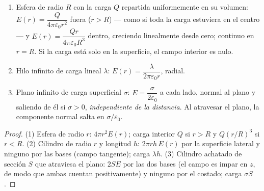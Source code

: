 \begin{proposition}\label{prop:b1:electrostatics-gauss:three}
\begin{enumerate}
  \item Esfera de radio $R$ con la carga $Q$ repartida uniformemente en su
        volumen: $E(r) = \dfrac{Q}{4\pi\varepsilon_0r^2}$ fuera ($r > R$) ---
        como si toda la carga estuviera en el centro --- y $E(r) =
        \dfrac{Qr}{4\pi\varepsilon_0R^3}$ dentro, creciendo linealmente desde cero;
        continuo en $r = R$. Si la carga está solo en la superficie, el
        campo interior es nulo.
  \item Hilo infinito de carga lineal $\lambda$: $E(r) =
        \dfrac{\lambda}{2\pi\varepsilon_0 r}$, radial.
  \item Plano infinito de carga superficial $\sigma$: $E = \dfrac{\sigma}{2\varepsilon_0}$
        a cada lado, normal al plano y saliendo de él si
        $\sigma > 0$, \emph{independiente de la distancia}. Al atravesar el
        plano, la componente normal salta en $\sigma/\varepsilon_0$.
\end{enumerate}
\end{proposition}

\begin{proof}
(1) Esfera de radio $r$:  $4\pi r^2E(r)$; carga interior $Q$ si
$r > R$ y $Q(r/R)^3$ si $r < R$. (2) Cilindro de radio $r$ y longitud $h$:
 $2\pi rh\,E(r)$ por la superficie lateral y ninguno por las bases
(campo tangente); carga $\lambda h$. (3) Cilindro achatado de sección $S$
que atraviesa el plano:  $2SE$ por las dos bases (el campo es impar
en $z$, de modo que ambas cuentan positivamente) y ninguno por el
costado; carga $\sigma S$.
\end{proof}


